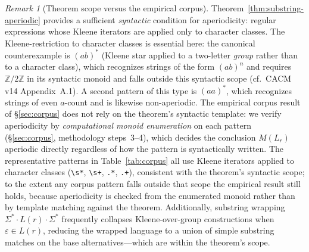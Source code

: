 \documentclass[letterpaper,twocolumn,10pt]{article}
\theoremstyle{definition}
\theoremstyle{remark}
\newtheorem{remark}[theorem]{Remark}
\begin{document}
\begin{remark}[Theorem scope versus the empirical corpus]
Theorem~\ref{thm:substring-aperiodic} provides a sufficient
\emph{syntactic} condition for aperiodicity: regular expressions whose
Kleene iterators are applied only to character classes.
The Kleene-restriction to character classes is essential here: the
canonical counterexample is $(ab)^*$ (Kleene star applied to a
two-letter \emph{group} rather than to a character class), which
recognizes strings of the form $(ab)^n$ and requires
$\mathbb{Z}/2\mathbb{Z}$ in its syntactic monoid and falls outside this
syntactic scope (cf.\ CACM v14 Appendix~A.1).
A second pattern of this type is $(aa)^*$, which recognizes strings of
even $a$-count and is likewise non-aperiodic.
The empirical corpus result of \S\ref{sec:corpus} does not rely on the
theorem's syntactic template: we verify aperiodicity by \emph{computational
monoid enumeration} on each pattern (\S\ref{sec:corpus}, methodology
steps~3--4), which decides the conclusion $M(L_r)$ aperiodic directly
regardless of how the pattern is syntactically written.
The representative patterns in Table~\ref{tab:corpus} all use Kleene
iterators applied to character classes
(\texttt{\textbackslash s*}, \texttt{\textbackslash s+}, \texttt{.*},
\texttt{.+}), consistent with the theorem's syntactic scope; to the
extent any corpus pattern falls outside that scope the empirical result
still holds, because aperiodicity is checked from the enumerated monoid
rather than by template matching against the theorem.
Additionally, substring wrapping $\Sigma^* \cdot L(r) \cdot \Sigma^*$
frequently collapses Kleene-over-group constructions when $\varepsilon
\in L(r)$, reducing the wrapped language to a union of simple substring
matches on the base alternatives---which are within the theorem's scope.
\end{remark}
\end{document}
